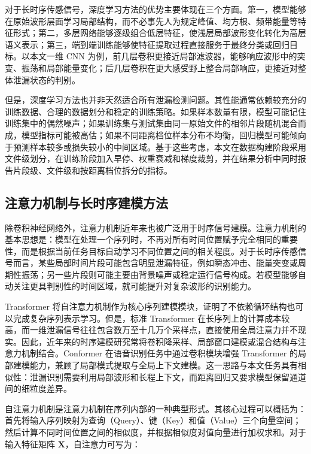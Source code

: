 对于长时序传感信号，深度学习方法的优势主要体现在三个方面。第一，模型能够在原始波形层面学习局部结构，而不必事先人为规定峰值、均方根、频带能量等特征形式；第二，多层网络能够逐级组合低层特征，使浅层局部波形变化转化为高层语义表示；第三，端到端训练能够使特征提取过程直接服务于最终分类或回归目标。以本文一维 CNN 为例，前几层卷积更接近局部滤波器，能够响应波形中的突变、振荡和局部能量变化；后几层卷积在更大感受野上整合局部响应，更接近对整体泄漏状态的判别。

但是，深度学习方法也并非天然适合所有泄漏检测问题。其性能通常依赖较充分的训练数据、合理的数据划分和稳定的训练策略。如果样本数量有限，模型可能记住训练集中的偶然噪声；如果训练集与测试集由同一原始文件的相邻片段随机混合而成，模型指标可能被高估；如果不同距离档位样本分布不均衡，回归模型可能倾向于预测样本较多或损失较小的中间区域。基于这些考虑，本文在数据构建阶段采用文件级划分，在训练阶段加入早停、权重衰减和梯度裁剪，并在结果分析中同时报告片段级、文件级和按距离档位拆分的指标。

\subsection{注意力机制与长时序建模方法}

除卷积神经网络外，注意力机制近年来也被广泛用于时序信号建模。注意力机制的基本思想是：模型在处理一个序列时，不再对所有时间位置赋予完全相同的重要性，而是根据当前任务目标自动学习不同位置之间的相关程度。对于长时序传感信号而言，某些局部时间片段可能包含明显泄漏特征，例如瞬态冲击、能量突变或周期性振荡；另一些片段则可能主要由背景噪声或稳定运行信号构成。若模型能够自动关注更具判别性的时间区域，就可能提升对复杂波形的识别能力。

Transformer 将自注意力机制作为核心序列建模模块，证明了不依赖循环结构也可以完成复杂序列表示学习\cite{vaswani2017attention}。但是，标准 Transformer 在长序列上的计算成本较高，而一维泄漏信号往往包含数万至十几万个采样点，直接使用全局注意力并不现实。因此，近年来的时序建模研究常将卷积降采样、局部窗口建模或混合结构与注意力机制结合。Conformer 在语音识别任务中通过卷积模块增强 Transformer 的局部建模能力，兼顾了局部模式提取与全局上下文建模\cite{gulati2020conformer}。这一思路与本文任务具有相似性：泄漏识别需要利用局部波形和长程上下文，而距离回归又要求模型保留通道间的细粒度差异。

自注意力机制是注意力机制在序列内部的一种典型形式。其核心过程可以概括为：首先将输入序列映射为查询（Query）、键（Key）和值（Value）三个向量空间；然后计算不同时间位置之间的相似度，并根据相似度对值向量进行加权求和。对于输入特征矩阵 $\mathbf{X}$，自注意力可写为：

